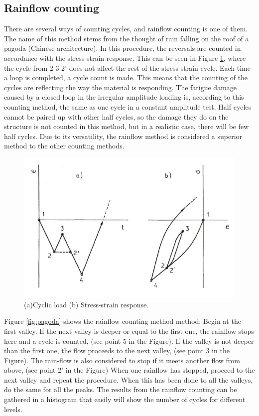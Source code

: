 \subsection{Rainflow counting}
\label{sec:rainflow}
There are several ways of counting cycles, and rainflow counting is one of them. The name of this method stems from the thought of rain falling on the roof of a pagoda (Chinese architecture). In this procedure, the reversals are counted in accordance with the stress-strain response. This can be seen in Figure \ref{fig:count}, where the cycle from 2-3-2' does not affect the rest of the stress-strain cycle. Each time a loop is completed, a cycle count is made. This means that the counting of the cycles are reflecting the way the material is responding. The fatigue damage caused by a closed loop in the irregular amplitude loading is, according to this counting method, the same as one cycle in a constant amplitude test. Half cycles cannot be paired up with other half cycles, so the damage they do on the structure is not counted in this method, but in a realistic case, there will be few half cycles. Due to its versatility, the rainflow method is considered a superior method to the other counting methods. 

\begin{figure}[H]
\centering
\includegraphics[scale=0.6]{figures/count}
\caption[$\; \:$Cyclic load and stress-strain response]{(a)Cyclic load (b) Stress-strain response.   \cite{fatigue2016} }
 \label{fig:count}
\end{figure}

\noindent Figure \ref{fig:pagoda} shows the rainflow counting method method:\newline 
\newline
Begin at the first valley. If the next valley is deeper or equal to the first one, the rainflow stops here and a cycle is counted, (see point 5 in the Figure). If the valley is not deeper than the first one, the flow proceeds to the next valley, (see point 3 in the Figure). The rain-flow is also considered to stop if it meets another flow from above, (see point 2' in the Figure) When one rainflow has stopped, proceed to the next valley and repeat the procedure. When this has been done to all the valleys, do the same for all the peaks. The results from the rainflow counting can be gathered in a histogram that easily will show the number of cycles for different levels. 


